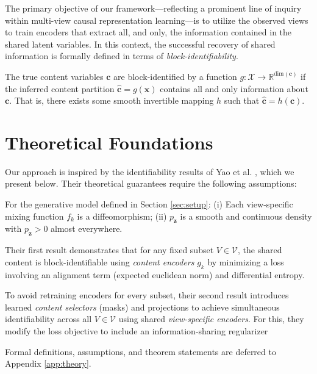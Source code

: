 \documentclass[a4paper,12pt]{article}
\begin{document}
The primary objective of our framework—reflecting a prominent line of inquiry within multi-view causal representation learning—is to utilize the observed views to train encoders that extract all, and only, the information contained in the shared latent variables. In this context, the successful recovery of shared information is formally defined in terms of \textit{block-identifiability}.
\begin{definition}
  The true content variables $\mathbf{c}$ are block-identified by a function $g: \mathcal{X} \rightarrow \mathbb{R}^{\text{dim}(\mathbf{c})}$ if the inferred content partition $\hat{\mathbf{c}} = g(\mathbf{x})$ contains all and only information about $\mathbf{c}$. That is, there exists some smooth invertible mapping $h$ such that $\hat{\mathbf{c}} = h(\mathbf{c})$.
\end{definition}

\section{Theoretical Foundations} \label{sec:TheorGuar}
Our approach is inspired by the identifiability results of Yao et al. \cite{yao2024multiviewcausalrepresentationlearning}, which we present below.
Their theoretical guarantees require the following assumptions:
\begin{assumption} \label{genAsm}
  For the generative model defined in Section \ref{sec:setup}:
  (i) Each view-specific mixing function $f_k$ is a diffeomorphism;
  (ii) $p_\mathbf{z}$ is a smooth and continuous density with $p_\mathbf{z} > 0$ almost everywhere.
\end{assumption}

Their first result demonstrates that for any fixed subset $V \in \mathcal{V}$, the shared content is block-identifiable using \textit{content encoders} $g_k$ by minimizing a loss involving an alignment term (expected euclidean norm) and differential entropy.

To avoid retraining encoders for every subset, their second result introduces learned \textit{content selectors} (masks) and projections to achieve simultaneous identifiability across all $V \in \mathcal{V}$ using shared \textit{view-specific encoders}.
For this, they modify the loss objective to include an information-sharing regularizer

Formal definitions, assumptions, and theorem statements are deferred to Appendix \ref{app:theory}.
\end{document}
